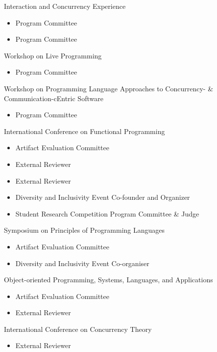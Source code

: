 \cvevent
{Interaction and Concurrency Experience}
{}{}{}
\begin{itemize}
\item Program Committee 
\item Program Committee 
\end{itemize}

\divider

\cvevent
{Workshop on Live Programming}
{}{}{}
\begin{itemize}
\item Program Committee 
\end{itemize}

\divider

\cvevent
{Workshop on Programming Language Approaches to Concurrency- \& Communication-cEntric Software}
{}{}{}
\begin{itemize}
\item Program Committee 
\end{itemize}

\divider

\cvevent
{International Conference on Functional Programming}
{}{}{}
\begin{itemize}
\item Artifact Evaluation Committee 
\item External Reviewer 
\item External Reviewer 
\item Diversity and Inclusivity Event Co-founder and Organizer 
\item Student Research Competition Program Committee \& Judge 
\end{itemize}

\divider

\cvevent
{Symposium on Principles of Programming Languages}
{}{}{}
\begin{itemize}
\item Artifact Evaluation Committee 
\item Diversity and Inclusivity Event Co-organiser 
\end{itemize}

\divider

\cvevent
{Object-oriented Programming, Systems, Languages, and Applications}
{}{}{}
\begin{itemize}
\item Artifact Evaluation Committee 
\item External Reviewer 
\end{itemize}

\divider

\cvevent
{International Conference on Concurrency Theory}
{}{}{}
\begin{itemize}
\item External Reviewer 
\end{itemize}
